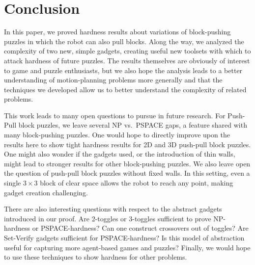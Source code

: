 \section{Conclusion}
In this paper, we proved hardness results about variations of block-pushing puzzles in which the robot can also pull blocks. Along the way, we analyzed the complexity of two new, simple gadgets, creating useful new toolsets with which to attack hardness of future puzzles. The results themselves are obviously of interest to game and puzzle enthusiasts, but we also hope the analysis leads to a better understanding of motion-planning problems more generally and that the techniques we developed allow us to better understand the complexity of related problems.

This work leads to many open questions to pursue in future research. For Push-Pull block puzzles, we leave several NP vs.\ PSPACE gaps, a feature shared with many block-pushing puzzles. One would hope to directly improve upon the results here to show tight hardness results for 2D and 3D push-pull block puzzles. One might also wonder if the gadgets used, or the introduction of thin walls, might lead to stronger results for other block-pushing puzzles. We also leave open the question of push-pull block puzzles without fixed walls. In this setting, even a single $3\times3$ block of clear space allows the robot to reach any point, making gadget creation challenging.

There are also interesting questions with respect to the abstract gadgets introduced in our proof. Are 2-toggles or 3-toggles sufficient to prove NP-hardness or PSPACE-hardness? Can one construct crossovers out of toggles? Are Set-Verify gadgets sufficient for PSPACE-hardness? Is this model of abstraction useful for capturing more agent-based games and puzzles? Finally, we would hope to use these techniques to show hardness for other problems.
%
%

